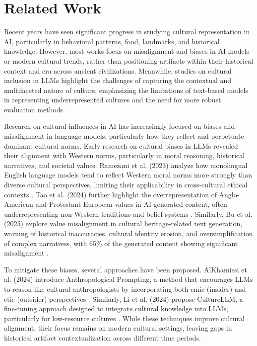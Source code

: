 \documentclass[11pt]{article}
\begin{document}
\section{Related Work}
Recent years have seen significant progress in studying cultural representation in AI, particularly in behavioral patterns, food, landmarks, and historical knowledge. However, most works focus on misalignment and biases in AI models or modern cultural trends, rather than positioning artifacts within their historical context and era across ancient civilizations. Meanwhile, studies on cultural inclusion in LLMs highlight the challenges of capturing the contextual and multifaceted nature of culture, emphasizing the limitations of text-based models in representing underrepresented cultures and the need for more robust evaluation methods \cite{adilazuarda2024towards}.

Research on cultural influences in AI has increasingly focused on biases and misalignment in language models, particularly how they reflect and perpetuate dominant cultural norms. Early research on cultural biases in LLMs revealed their alignment with Western norms, particularly in moral reasoning, historical narratives, and societal values. Ramezani et al. (2023) analyze how monolingual English language models tend to reflect Western moral norms more strongly than diverse cultural perspectives, limiting their applicability in cross-cultural ethical contexts \cite{Ramezani2023KnowledgeOC}. Tao et al. (2024) further highlight the overrepresentation of Anglo-American and Protestant European values in AI-generated content, often underrepresenting non-Western traditions and belief systems \cite{tao2024cultural}. Similarly, Bu et al. (2025) explore value misalignment in cultural heritage-related text generation, warning of historical inaccuracies, cultural identity erosion, and oversimplification of complex narratives, with 65\% of the generated content showing significant misalignment \cite{bu2025investigation}.

To mitigate these biases, several approaches have been proposed. AlKhamissi et al. (2024) introduce Anthropological Prompting, a method that encourages LLMs to reason like cultural anthropologists by incorporating both emic (insider) and etic (outsider) perspectives \cite{AlKhamissi2024InvestigatingCA}. Similarly, Li et al. (2024) propose CultureLLM, a fine-tuning approach designed to integrate cultural knowledge into LLMs, particularly for low-resource cultures \cite{li2024culturellm}. While these techniques improve cultural alignment, their focus remains on modern cultural settings, leaving gaps in historical artifact contextualization across different time periods.
\end{document}
